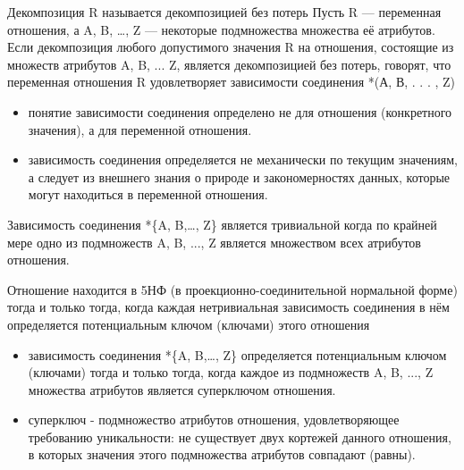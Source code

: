 \documentclass{beamer}
\begin{document}
\begin{frame}
\begin{block}{Декомпозиция R называется декомпозицией без потерь}
Пусть R — переменная отношения, а A, B, …, Z — некоторые подмножества множества её атрибутов.
Если декомпозиция любого допустимого значения R на отношения, состоящие из множеств атрибутов A, B, ... Z, является декомпозицией без потерь, говорят, что переменная отношения R удовлетворяет зависимости соединения *(А, В, . . . , Z)\end{block}
\begin{itemize}
\item понятие зависимости соединения определено не для отношения (конкретного значения), а для переменной отношения. \item зависимость соединения определяется не механически по текущим значениям, а следует из внешнего знания о природе и закономерностях данных, которые могут находиться в переменной отношения. 
\end{itemize}
\begin{block}{Зависимость соединения *\{A, B,…, Z\} является тривиальной}
когда по крайней мере одно из подмножеств A, B, ..., Z является множеством всех атрибутов отношения.
\end{block}
\end{frame}

\begin{frame}
\begin{block}{Отношение находится в 5НФ (в проекционно-соединительной нормальной форме)}
тогда и только тогда, когда каждая нетривиальная зависимость соединения в нём определяется потенциальным ключом (ключами) этого отношения
\end{block}
\begin{itemize}
\item зависимость соединения *\{A, B,…, Z\} определяется потенциальным ключом (ключами) тогда и только тогда, когда каждое из подмножеств A, B, ..., Z множества атрибутов является суперключом отношения. 
\item суперключ - подмножество атрибутов отношения, удовлетворяющее требованию уникальности: не существует двух кортежей данного отношения, в которых значения этого подмножества атрибутов совпадают (равны). 
\end{itemize}
\end{frame}
\end{document}
